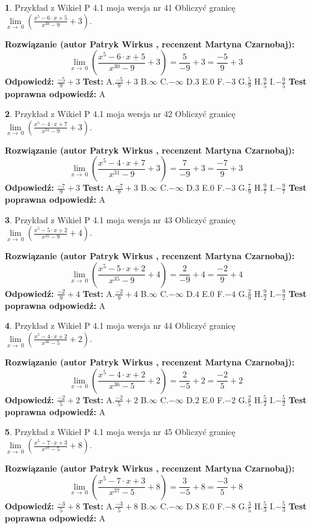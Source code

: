 \documentclass[12pt, a4paper]{article}
\theoremstyle{definition} %
\newtheorem{zad}{}
\newcommand{\zadStart}[1]{\begin{zad}#1\newline}
\newcommand{\zadStop}{\end{zad}}
\newcommand{\rozwStart}[2]{\noindent \textbf{Rozwiązanie (autor #1 , recenzent #2): }\newline}
\newcommand{\rozwStop}{\newline}
\newcommand{\odpStart}{\noindent \textbf{Odpowiedź:}\newline}
\newcommand{\odpStop}{\newline}
\newcommand{\testStart}{\noindent \textbf{Test:}\newline}
\newcommand{\testStop}{\newline}
\newcommand{\kluczStart}{\noindent \textbf{Test poprawna odpowiedź:}\newline}
\newcommand{\kluczStop}{\newline}
\begin{document}
\zadStart{Przykład z Wikieł P 4.1 moja wersja nr 41}
Obliczyć granicę $\lim\limits_{x\to\ 0}(\frac{x^{5}-6 \cdot x +5}{x^{30}-9}+3)$.
\zadStop
\rozwStart{Patryk Wirkus}{Martyna Czarnobaj}
$$\lim\limits_{x\to\ 0}(\frac{x^{5}-6 \cdot x +5}{x^{30}-9}+3)=\frac{5}{-9}+3=\frac{-5}{9}+3$$
\rozwStop
\odpStart
$\frac{-5}{9}+3$
\odpStop
\testStart
A.$\frac{-5}{9}+3$
B.$\infty$
C.$-\infty$
D.$3$
E.$0$
F.$-3$
G.$\frac{5}{9}$
H.$\frac{9}{5}$
I.$-\frac{9}{5}$
\testStop
\kluczStart
A
\kluczStop



\zadStart{Przykład z Wikieł P 4.1 moja wersja nr 42}
Obliczyć granicę $\lim\limits_{x\to\ 0}(\frac{x^{5}-4 \cdot x +7}{x^{31}-9}+3)$.
\zadStop
\rozwStart{Patryk Wirkus}{Martyna Czarnobaj}
$$\lim\limits_{x\to\ 0}(\frac{x^{5}-4 \cdot x +7}{x^{31}-9}+3)=\frac{7}{-9}+3=\frac{-7}{9}+3$$
\rozwStop
\odpStart
$\frac{-7}{9}+3$
\odpStop
\testStart
A.$\frac{-7}{9}+3$
B.$\infty$
C.$-\infty$
D.$3$
E.$0$
F.$-3$
G.$\frac{7}{9}$
H.$\frac{9}{7}$
I.$-\frac{9}{7}$
\testStop
\kluczStart
A
\kluczStop



\zadStart{Przykład z Wikieł P 4.1 moja wersja nr 43}
Obliczyć granicę $\lim\limits_{x\to\ 0}(\frac{x^{5}-5 \cdot x +2}{x^{35}-9}+4)$.
\zadStop
\rozwStart{Patryk Wirkus}{Martyna Czarnobaj}
$$\lim\limits_{x\to\ 0}(\frac{x^{5}-5 \cdot x +2}{x^{35}-9}+4)=\frac{2}{-9}+4=\frac{-2}{9}+4$$
\rozwStop
\odpStart
$\frac{-2}{9}+4$
\odpStop
\testStart
A.$\frac{-2}{9}+4$
B.$\infty$
C.$-\infty$
D.$4$
E.$0$
F.$-4$
G.$\frac{2}{9}$
H.$\frac{9}{2}$
I.$-\frac{9}{2}$
\testStop
\kluczStart
A
\kluczStop



\zadStart{Przykład z Wikieł P 4.1 moja wersja nr 44}
Obliczyć granicę $\lim\limits_{x\to\ 0}(\frac{x^{5}-4 \cdot x +2}{x^{36}-5}+2)$.
\zadStop
\rozwStart{Patryk Wirkus}{Martyna Czarnobaj}
$$\lim\limits_{x\to\ 0}(\frac{x^{5}-4 \cdot x +2}{x^{36}-5}+2)=\frac{2}{-5}+2=\frac{-2}{5}+2$$
\rozwStop
\odpStart
$\frac{-2}{5}+2$
\odpStop
\testStart
A.$\frac{-2}{5}+2$
B.$\infty$
C.$-\infty$
D.$2$
E.$0$
F.$-2$
G.$\frac{2}{5}$
H.$\frac{5}{2}$
I.$-\frac{5}{2}$
\testStop
\kluczStart
A
\kluczStop



\zadStart{Przykład z Wikieł P 4.1 moja wersja nr 45}
Obliczyć granicę $\lim\limits_{x\to\ 0}(\frac{x^{5}-7 \cdot x +3}{x^{37}-5}+8)$.
\zadStop
\rozwStart{Patryk Wirkus}{Martyna Czarnobaj}
$$\lim\limits_{x\to\ 0}(\frac{x^{5}-7 \cdot x +3}{x^{37}-5}+8)=\frac{3}{-5}+8=\frac{-3}{5}+8$$
\rozwStop
\odpStart
$\frac{-3}{5}+8$
\odpStop
\testStart
A.$\frac{-3}{5}+8$
B.$\infty$
C.$-\infty$
D.$8$
E.$0$
F.$-8$
G.$\frac{3}{5}$
H.$\frac{5}{3}$
I.$-\frac{5}{3}$
\testStop
\kluczStart
A
\kluczStop
\end{document}

